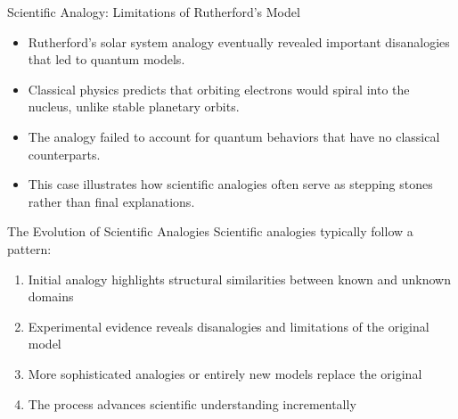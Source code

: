 \documentclass{beamer}
\begin{document}
\begin{frame}{Scientific Analogy: Limitations of Rutherford's Model}
	\begin{itemize}
		\item Rutherford's solar system analogy eventually revealed important disanalogies that led to quantum models.
		\item Classical physics predicts that orbiting electrons would spiral into the nucleus, unlike stable planetary orbits.
		\item The analogy failed to account for quantum behaviors that have no classical counterparts.
		\item This case illustrates how scientific analogies often serve as stepping stones rather than final explanations.
	\end{itemize}
	
	\begin{alertblock}{The Evolution of Scientific Analogies}
		\scriptsize
		Scientific analogies typically follow a pattern:
		\begin{enumerate}
			\item Initial analogy highlights structural similarities between known and unknown domains
			\item Experimental evidence reveals disanalogies and limitations of the original model
			\item More sophisticated analogies or entirely new models replace the original
			\item The process advances scientific understanding incrementally
		\end{enumerate}
	\end{alertblock}
\end{frame}
\end{document}
